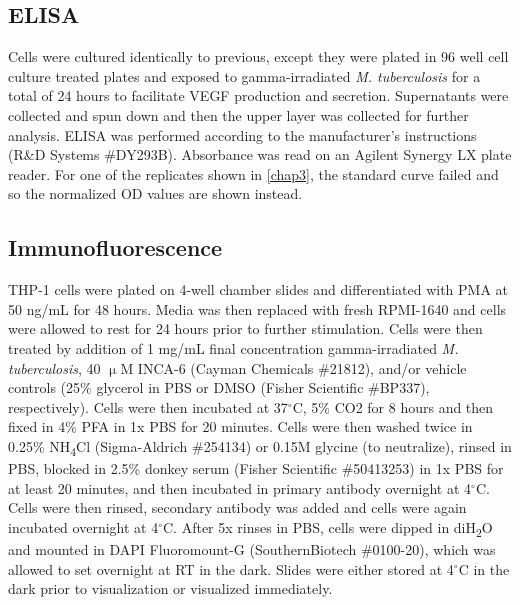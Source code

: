 \citep{Cikos2007}


\subsection{ELISA}

Cells were cultured identically to previous, except they were plated in 96 well cell culture treated plates and exposed to gamma-irradiated \textit{M. tuberculosis} for a total of 24 hours to facilitate VEGF production and secretion. Supernatants were collected and spun down and then the upper layer was collected for further analysis. ELISA was performed according to the manufacturer's instructions (R\&D Systems \#DY293B). Absorbance was read on an Agilent Synergy LX plate reader. For one of the replicates shown in \autoref{chap3}, the standard curve failed and so the normalized OD values are shown instead.

\subsection{Immunofluorescence}

THP-1 cells were plated on 4-well chamber slides and differentiated with PMA at 50 ng/mL for 48 hours. Media was then replaced with fresh RPMI-1640 and cells were allowed to rest for 24 hours prior to further stimulation. Cells were then treated by addition of 1 mg/mL final concentration gamma-irradiated \textit{M. tuberculosis}, 40 $\upmu$M INCA-6 (Cayman Chemicals \#21812), and/or vehicle controls (25\% glycerol in PBS or DMSO (Fisher Scientific \#BP337), respectively). Cells were then incubated at 37$^{\circ}$C, 5\% CO2 for 8 hours and then fixed in 4\% PFA in 1x PBS for 20 minutes. Cells were then washed twice in 0.25\% NH\textsubscript{4}Cl (Sigma-Aldrich \#254134) or 0.15M glycine (to neutralize), rinsed in PBS, blocked in 2.5\% donkey serum (Fisher Scientific \#50413253) in 1x PBS for at least 20 minutes, and then incubated in primary antibody overnight at 4$^{\circ}$C. Cells were then rinsed, secondary antibody was added and cells were again incubated overnight at 4$^{\circ}$C. After 5x rinses in PBS, cells were dipped in diH\textsubscript{2}O and mounted in DAPI Fluoromount-G (SouthernBiotech \#0100-20), which was allowed to set overnight at RT in the dark. Slides were either stored at 4$^{\circ}$C in the dark prior to visualization or visualized immediately. 


